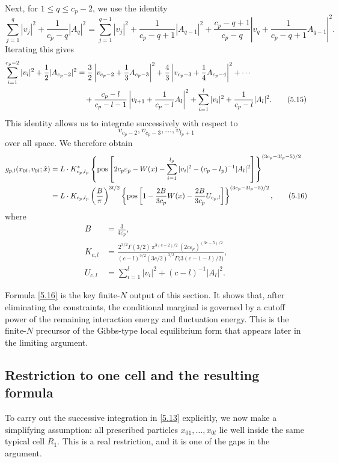 \documentclass[11pt]{article}
\begin{document}
Next, for $1\le q\le c_p-2$, we use the identity
\[
\sum_{j=1}^q|v_j|^2+\frac{1}{c_p-q}|A_q|^2
=
\sum_{j=1}^{q-1}|v_j|^2+\frac{1}{c_p-q+1}|A_{q-1}|^2
+
\frac{c_p-q+1}{c_p-q}
\left|v_q+\frac{1}{c_p-q+1}A_{q-1}\right|^2.
\]
Iterating this gives
\begin{align}
\sum_{i=1}^{c_p-2}|v_i|^2+\frac12|A_{c_p-2}|^2
&=
\frac32\left|v_{c_p-2}+\frac13A_{c_p-3}\right|^2
+
\frac43\left|v_{c_p-3}+\frac14A_{c_p-4}\right|^2
+\cdots
\notag\\
&\quad
+
\frac{c_p-l}{c_p-l-1}\left|v_{l+1}+\frac{1}{c_p-l}A_l\right|^2
+
\sum_{i=1}^l|v_i|^2
+
\frac{1}{c_p-l}|A_l|^2.
\tag{5.15}\label{5.15}
\end{align}
This identity allows us to integrate successively with respect to
\[
v_{c_p-2},v_{c_p-3},\dots,v_{l_p+1}
\]
over all space. We therefore obtain
\begin{align}
g_{p,l}(x_{0l},v_{0l};\hat x)
&=
L\cdot K^*_{c_p,l_p}
\left\{
\mathrm{pos}
\left[
2c_p\varepsilon_p
-
W(x)
-
\sum_{i=1}^{l_p}|v_i|^2
-
(c_p-l_p)^{-1}|A_l|^2
\right]
\right\}^{(3c_p-3l_p-5)/2}
\notag\\
&=
L\cdot K_{c_p,l_p}
\left(\frac{B}{\pi}\right)^{3l/2}
\left\{
\mathrm{pos}
\left[
1-\frac{2B}{3c_p}W(x)-\frac{2B}{3c_p}U_{c_p,l}
\right]
\right\}^{(3c_p-3l_p-5)/2},
\tag{5.16}\label{5.16}
\end{align}
where
\begin{align*}
B&=\frac{3}{4\varepsilon_p},\\
K_{c,l}
&=
\frac{
2^{3/2}\Gamma(3/2)\,\pi^{3(c-2)/2}\,(2c\varepsilon_p)^{(3c-5)/2}
}{
(c-l)^{3/2}(3c/2)^{3/2}\Gamma\!\bigl(3(c-1-l)/2\bigr)
},\\
U_{c,l}
&=
\sum_{i=1}^l|v_i|^2+(c-l)^{-1}|A_l|^2.
\end{align*}

Formula \eqref{5.16} is the key finite-$N$ output of this section. It shows that, after eliminating the constraints, the conditional marginal is governed by a cutoff power of the remaining interaction energy and fluctuation energy. This is the finite-$N$ precursor of the Gibbs-type local equilibrium form that appears later in the limiting argument.

\subsection{Restriction to one cell and the resulting formula}

To carry out the successive integration in \eqref{5.13} explicitly, we now make a simplifying assumption: all prescribed particles $x_{01},\dots,x_{0l}$
lie well inside the same typical cell $R_1$. This is a real restriction, and it is one of the gaps in the argument.
\end{document}
